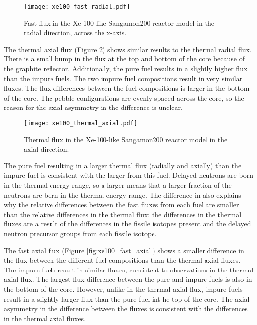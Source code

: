 \begin{figure}[ht]
        \centering 
        \texttt{[image: xe100\_fast\_radial.pdf]}
        \caption{Fast flux in the Xe-100-like Sangamon200 
        reactor model in the radial direction, across the 
        x-axis.}
        \label{fig:xe100_fast_radial}
\end{figure}


The thermal axial flux (Figure \ref{fig:xe100_thermal_axial}) shows 
similar results to the thermal radial flux. There is a small bump in the 
flux at the top and bottom of the core because of the graphite reflector.
Additionally, the pure fuel results in a slightly higher flux than 
the impure fuels. The 
two impure fuel compositions result in very similar fluxes. The flux 
differences between the fuel compositions is larger in the bottom 
of the core. The pebble configurations are evenly spaced across the 
core, so the reason for the axial asymmetry in the difference is 
unclear. 

\begin{figure}[ht]
        \centering 
        \texttt{[image: xe100\_thermal\_axial.pdf]}
        \caption{Thermal flux in the Xe-100-like Sangamon200 
        reactor model in the axial direction.}
        \label{fig:xe100_thermal_axial}
\end{figure}

The pure fuel resulting in a larger thermal flux (radially and 
axially) than the impure fuel is consistent with the larger \betaEff 
from this fuel. Delayed neutrons are born in the thermal energy range, 
so a larger \betaEff means that a larger fraction of the neutrons are 
born in the thermal energy range. The difference in \betaEff also explains 
why the relative differences between the fast fluxes from each fuel are 
smaller than the relative differences in the thermal flux: the differences 
in the thermal fluxes are a result of the differences in the fissile 
isotopes present and the delayed neutron precursor groups from each 
fissile isotope. 

The fast axial flux (Figure \ref{fig:xe100_fast_axial}) shows a smaller 
difference in the flux between the different fuel compositions than the 
thermal axial fluxes. The 
impure fuels result in similar fluxes, consistent to observations in 
the thermal axial flux. The largest flux difference between the pure 
and impure fuels is also in the bottom of the core. However, unlike 
in the thermal axial flux, impure fuels result in a slightly larger 
flux than the pure fuel int he top of the core. The axial asymmetry in 
the difference between the fluxes is consistent with the differences in 
the thermal axial fluxes. 

